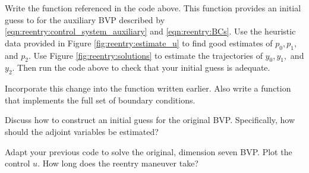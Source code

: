 \begin{problem}
	Write the function  referenced in the code above. 
	This function provides an initial guess to  for the auxiliary BVP described by  \eqref{eqn:reentry:control_system_auxiliary} and \eqref{eqn:reentry:BCs}.
	Use the heuristic data provided in Figure \ref{fig:reentry:estimate_u} to find good estimates of $p_0, p_1,$ and $p_2$. 
	Use Figure \ref{fig:reentry:solutions} to estimate the trajectories of $y_0, y_1,$ and $y_2$.
	Then run the code above to check that your initial guess is adequate. 
	\label{prob:reentry:guess}
\end{problem}






\begin{problem}
Incorporate this change into the function  written earlier. 
Also write a function  that implements the full set of boundary conditions. 
\end{problem}

Discuss how to construct an initial guess for the original BVP. Specifically, how should the adjoint variables be estimated?
\begin{problem}
	Adapt your previous code to solve the original, dimension seven BVP. 
	Plot the control $u$. How long does the reentry maneuver take? 
\end{problem}





%
%
%









